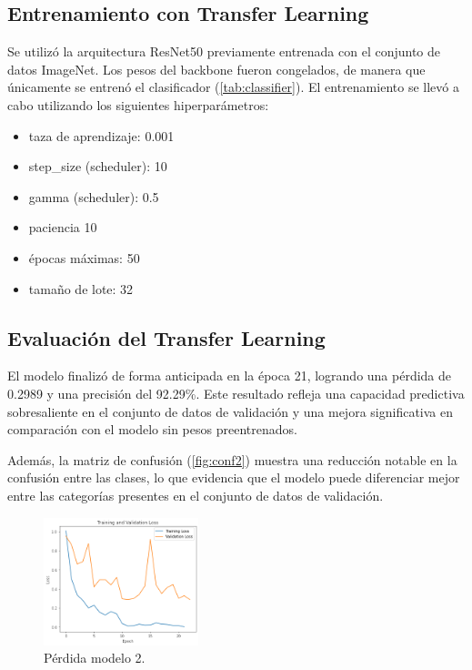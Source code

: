 \documentclass[twocolumn]{article}
\begin{document}
\subsection{Entrenamiento con Transfer Learning} 
Se utilizó la arquitectura ResNet50 previamente entrenada con el conjunto de datos ImageNet. Los pesos del backbone fueron congelados, de manera que únicamente se entrenó el clasificador (\ref{tab:classifier}). El entrenamiento se llevó a cabo utilizando los siguientes hiperparámetros:
\begin{itemize}
    \setlength\itemsep{0.1em}
    \item taza de aprendizaje: 0.001
    \item step\_size (scheduler): 10
    \item gamma (scheduler): 0.5
    \item paciencia 10
    \item épocas máximas: 50
    \item tamaño de lote: 32
\end{itemize}

\subsection{Evaluación del Transfer Learning} El modelo finalizó de forma anticipada en la época 21, logrando una pérdida de 0.2989 y una precisión del 92.29\%. Este resultado refleja una capacidad predictiva sobresaliente en el conjunto de datos de validación y una mejora significativa en comparación con el modelo sin pesos preentrenados.

Además, la matriz de confusión (\ref{fig:conf2}) muestra una reducción notable en la confusión entre las clases, lo que evidencia que el modelo puede diferenciar mejor entre las categorías presentes en el conjunto de datos de validación.

\begin{figure}[!ht]
\centering
\includegraphics[width=0.4\textwidth]{assets/trainmodel2loss.png}
\caption{Pérdida modelo 2.}
\label{fig:train2loss}
\end{figure}
\end{document}
